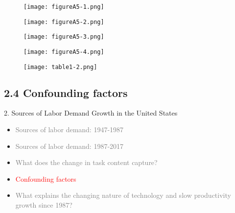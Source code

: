 \documentclass[notes=show]{beamer}
\begin{document}
\newpage
\begin{center}
\begin{figure}
\texttt{[image: figureA5-1.png]}
\end{figure} 
\end{center}
\newpage

\newpage
\begin{center}
\begin{figure}
\texttt{[image: figureA5-2.png]}
\end{figure} 
\end{center}
\newpage

\newpage
\begin{center}
\begin{figure}
\texttt{[image: figureA5-3.png]}
\end{figure} 
\end{center}
\newpage

\newpage
\begin{center}
\begin{figure}
\texttt{[image: figureA5-4.png]}
\end{figure} 
\end{center}
\newpage

\newpage
\begin{center}
\begin{figure}
\texttt{[image: table1-2.png]}
\end{figure} 
\end{center}
\newpage

\subsection{2.4 Confounding factors}

\begin{frame}{2. Sources of Labor Demand Growth in the United States}
\begin{itemize}
\item[\textcolor{gray}{2.1}] \textcolor{gray}{Sources of labor demand: 1947-1987} \medskip
\item[\textcolor{gray}{2.2}] \textcolor{gray}{Sources of labor demand: 1987-2017} \medskip
\item[\textcolor{gray}{2.3}] \textcolor{gray}{What does the change in task content capture?} \medskip
\item[\textcolor{red}{2.4}] \textcolor{red}{Confounding factors} \medskip
\item[\textcolor{gray}{2.5}] \textcolor{gray}{What explains the changing nature of technology and slow productivity growth since 1987?} 
\end{itemize}
\end{frame}
\end{document}
